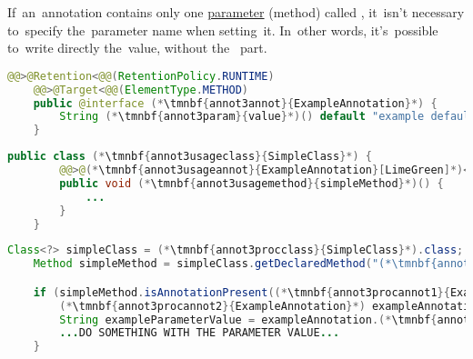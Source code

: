 If~an~annotation contains only one \hyperref[parameterargument]{parameter} (method) called , it~isn't necessary to~specify the~parameter name when setting~it.
In~other words, it's~possible to~write directly the~value, without \mbox{the } part.

\example
\begin{lstlisting}[language=Java, title={Annotation with single parameter called \itq{value}}]
    @@>@Retention<@@(RetentionPolicy.RUNTIME)
    @@>@Target<@@(ElementType.METHOD)
    public @interface (*\tmnbf{annot3annot}{ExampleAnnotation}*) {
        String (*\tmnbf{annot3param}{value}*)() default "example default value";
    }
\end{lstlisting}
\begin{lstlisting}[language=Java, title={Setting the~parameter value~--~no~need to~write \mbitq{value = }}]
    public class (*\tmnbf{annot3usageclass}{SimpleClass}*) {
        @@>@(*\tmnbf{annot3usageannot}{ExampleAnnotation}[LimeGreen]*)<@@("new value")
        public void (*\tmnbf{annot3usagemethod}{simpleMethod}*)() {
            ...
        }
    }
\end{lstlisting}
\begin{lstlisting}[language=Java, title={Runtime annotation processing}]
    Class<?> simpleClass = (*\tmnbf{annot3procclass}{SimpleClass}*).class;
    Method simpleMethod = simpleClass.getDeclaredMethod("(*\tmnbf{annot3procmethod}{simpleMethod}[ForestGreen]*)");

    if (simpleMethod.isAnnotationPresent((*\tmnbf{annot3procannot1}{ExampleAnnotation}*).class)) {
        (*\tmnbf{annot3procannot2}{ExampleAnnotation}*) exampleAnnotation = simpleMethod.getAnnotation((*\tmnbf{annot3procannot3}{ExampleAnnotation}*).class);
        String exampleParameterValue = exampleAnnotation.(*\tmnbf{annot3procparam}{value}*)();
        ...DO SOMETHING WITH THE PARAMETER VALUE...
    }
\end{lstlisting}



